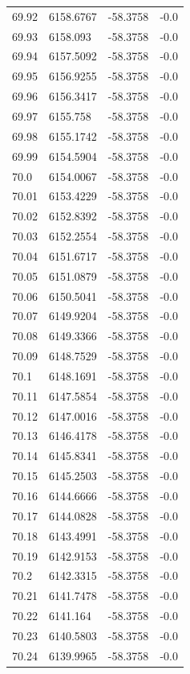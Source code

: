 \begin{table}[H]
\begin{tabular}{llll}
69.92 & 6158.6767 & -58.3758 & -0.0 \\
69.93 & 6158.093 & -58.3758 & -0.0 \\
69.94 & 6157.5092 & -58.3758 & -0.0 \\
69.95 & 6156.9255 & -58.3758 & -0.0 \\
69.96 & 6156.3417 & -58.3758 & -0.0 \\
69.97 & 6155.758 & -58.3758 & -0.0 \\
69.98 & 6155.1742 & -58.3758 & -0.0 \\
69.99 & 6154.5904 & -58.3758 & -0.0 \\
70.0 & 6154.0067 & -58.3758 & -0.0 \\
70.01 & 6153.4229 & -58.3758 & -0.0 \\
70.02 & 6152.8392 & -58.3758 & -0.0 \\
70.03 & 6152.2554 & -58.3758 & -0.0 \\
70.04 & 6151.6717 & -58.3758 & -0.0 \\
70.05 & 6151.0879 & -58.3758 & -0.0 \\
70.06 & 6150.5041 & -58.3758 & -0.0 \\
70.07 & 6149.9204 & -58.3758 & -0.0 \\
70.08 & 6149.3366 & -58.3758 & -0.0 \\
70.09 & 6148.7529 & -58.3758 & -0.0 \\
70.1 & 6148.1691 & -58.3758 & -0.0 \\
70.11 & 6147.5854 & -58.3758 & -0.0 \\
70.12 & 6147.0016 & -58.3758 & -0.0 \\
70.13 & 6146.4178 & -58.3758 & -0.0 \\
70.14 & 6145.8341 & -58.3758 & -0.0 \\
70.15 & 6145.2503 & -58.3758 & -0.0 \\
70.16 & 6144.6666 & -58.3758 & -0.0 \\
70.17 & 6144.0828 & -58.3758 & -0.0 \\
70.18 & 6143.4991 & -58.3758 & -0.0 \\
70.19 & 6142.9153 & -58.3758 & -0.0 \\
70.2 & 6142.3315 & -58.3758 & -0.0 \\
70.21 & 6141.7478 & -58.3758 & -0.0 \\
70.22 & 6141.164 & -58.3758 & -0.0 \\
70.23 & 6140.5803 & -58.3758 & -0.0 \\
70.24 & 6139.9965 & -58.3758 & -0.0 \\

\end{tabular}
\end{table}
